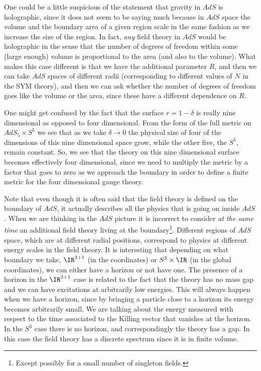 One could be a little suspicious of the statement that gravity 
in $AdS$ is holographic, since it does not seem to be saying much
because in $AdS$ space
the volume and the boundary area of a given region scale in the
same fashion as we increase the size of the region. 
In fact, {\it any } field theory in $AdS$ would
be holographic in the sense that the number of degrees of 
freedom within some (large enough) 
volume is proportional to the area (and also to the volume). What makes 
this case different is that we have the additional 
parameter $R$, and then we can take $AdS$ spaces of 
different radii (corresponding to different values of
$N$ in the SYM theory),
and then we can ask whether the number of
degrees of freedom goes like the volume or the area, since 
these have a different dependence on $R$. 

One might  get confused by the fact that the surface $r =1-\delta$
is really nine dimensional as opposed to four dimensional. From the
form of the full metric on $AdS_5\times S^5$ 
we see that as we take $\delta \to 0$ the physical size of
four of the dimensions
of this nine dimensional space grow, while the other five, the $S^5$, 
remain constant. So, we see that the theory on this nine dimensional 
surface  becomes effectively four dimensional, since we need to multiply 
the metric by a factor that goes to zero as we approach the boundary
in order to define a finite  metric
for the four dimensional gauge theory. 

Note that even though it is often said that the field theory 
is defined on the boundary of $AdS$, it actually describes 
all the physics that is going on inside $AdS$.
When we are thinking in the $AdS$ picture it is incorrect to 
consider {\it at the same time} an additional field theory living
at the boundary\footnote{Except possibly for a small number of
singleton fields.}. Different regions of $AdS$ space, which are at
different radial positions, correspond to 
physics at different energy scales in the field theory. 
It is interesting that depending on what boundary we take, $\IR^{3+1}$ 
(in the \Poincare coordinates) or $S^3\times \IR$ (in the global coordinates),
we can either have a horizon or not have one. The 
presence of a horizon in the  $\IR^{3+1}$ case is related to the 
fact that the theory has no mass gap and we can have
excitations at arbitrarily low energies. This will always happen
when we have a horizon, since by bringing a particle close to a horizon
its energy becomes arbitrarily small. We are talking about the
energy  measured with respect to the time associated to the
Killing vector that vanishes at the horizon. In the $S^3 $ case there
is no horizon, and correspondingly the theory has a gap. In this
case the field theory
has a discrete spectrum since it is in finite volume. 

